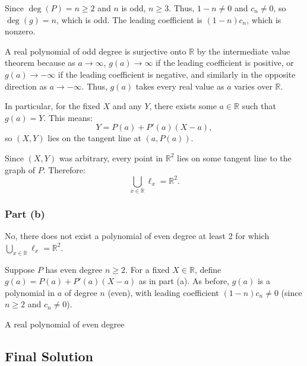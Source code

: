 \documentclass[12pt,a4paper]{article}
\theoremstyle{definition}
\begin{document}
    Since $\deg(P) = n \geq 2$ and $n$ is odd, $n \geq 3$. Thus, $1 - n \neq 0$ and $c_n \neq 0$, so $\deg(g) = n$, which is odd. The leading coefficient is $(1 - n) c_n$, which is nonzero.

    A real polynomial of odd degree is surjective onto $\mathbb{R}$ by the intermediate value theorem because as $a \to \infty$, $g(a) \to \infty$ if the leading coefficient is positive, or $g(a) \to -\infty$ if the leading coefficient is negative, and similarly in the opposite direction as $a \to -\infty$. Thus, $g(a)$ takes every real value as $a$ varies over $\mathbb{R}$.

    In particular, for the fixed $X$ and any $Y$, there exists some $a \in \mathbb{R}$ such that $g(a) = Y$. This means:
    \[
        Y = P(a) + P'(a)(X - a),
    \]
    so $(X, Y)$ lies on the tangent line at $(a, P(a))$.

    Since $(X, Y)$ was arbitrary, every point in $\mathbb{R}^2$ lies on some tangent line to the graph of $P$. Therefore:
    \[
        \bigcup_{x \in \mathbb{R}} \ell_x = \mathbb{R}^2.
    \]

    \subsubsection*{Part (b)}
    No, there does not exist a polynomial of even degree at least 2 for which $\bigcup_{x \in \mathbb{R}} \ell_x = \mathbb{R}^2$.

    Suppose $P$ has even degree $n \geq 2$. For a fixed $X \in \mathbb{R}$, define $g(a) = P(a) + P'(a)(X - a)$ as in part (a). As before, $g(a)$ is a polynomial in $a$ of degree $n$ (even), with leading coefficient $(1 - n) c_n \neq 0$ (since $n \geq 2$ and $c_n \neq 0$).

    A real polynomial of even degree

    \subsection{Final Solution}
\end{document}
